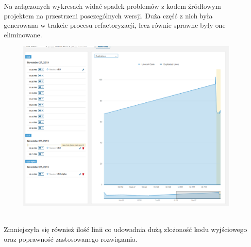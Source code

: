 \documentclass[a4paper, 11pt]{article}
\begin{document}
Na załączonych wykresach widać spadek problemów z kodem źródłowym projektem na przestrzeni posczególnych wersji. Duża część z nich była generowana w trakcie procesu refactoryzacji, lecz równie sprawne były one eliminowane.
\begin{figure}[!tbh]
\includegraphics[width=16cm]{final_dup}
\centering
\end{figure}\\
Zmniejszyła się również ilość linii co udowadnia dużą złożoność kodu wyjściowego oraz poprawność zastosowanego rozwiązania.
\end{document}
